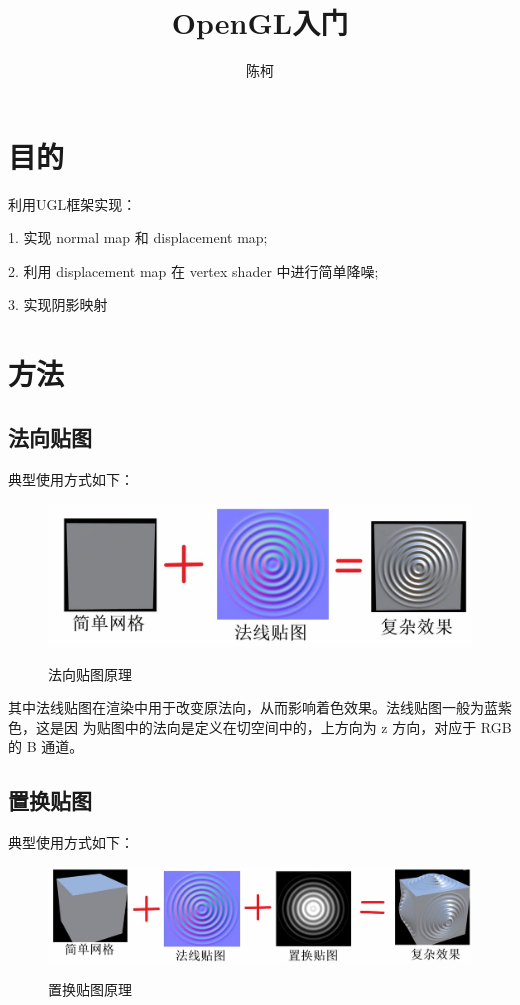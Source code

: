 \documentclass{article}
\title{OpenGL入门}
\author{陈柯}
\begin{document}
	\maketitle
	
	\section{目的}
	利用UGL框架实现：
	
	1. 实现 normal map 和 displacement map;
	
	2. 利用 displacement map 在 vertex shader 中进行简单降噪;
	
	3. 实现阴影映射
	\section{方法}
	\subsection{法向贴图}
	典型使用方式如下：
	\begin{figure}[htb]
		\caption{\label{table.label} 法向贴图原理} \centering
		\begin{center}
			\includegraphics[width=6in]{normal_map_usage.jpg}
			\label{figure.label}
		\end{center}
	\end{figure}
	
	其中法线贴图在渲染中用于改变原法向，从而影响着色效果。法线贴图一般为蓝紫色，这是因
	为贴图中的法向是定义在切空间中的，上方向为 z 方向，对应于 RGB 的 B 通道。
	\subsection{置换贴图}
	典型使用方式如下：\clearpage
	\begin{figure}[htb]
		\caption{\label{table.label} 置换贴图原理} \centering
		\begin{center}
			\includegraphics[width=6in]{displacement_map_usage.jpg}
			\label{figure.label}
		\end{center}
	\end{figure}
\end{document}
